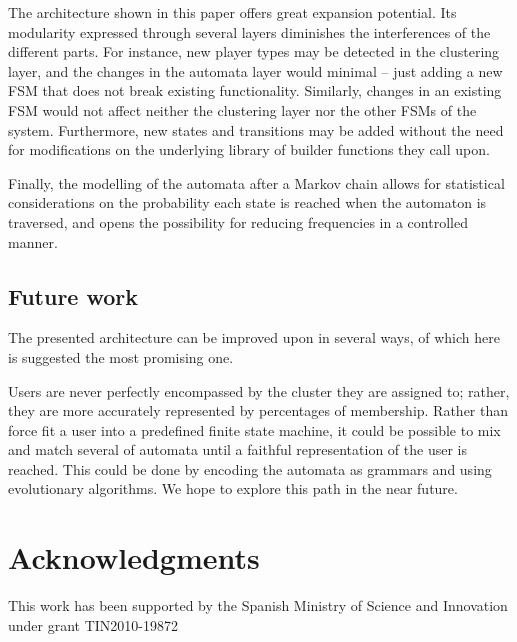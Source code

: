 \documentclass[conference]{IEEEtran}
\begin{document}
The architecture shown in this paper offers great expansion potential. Its modularity expressed through several layers diminishes the interferences of the different parts. For instance, new player types may be detected in the clustering layer, and the changes in the automata layer would minimal -- just adding a new FSM that does not break existing functionality. Similarly, changes in an existing FSM would not affect neither the clustering layer nor the other FSMs of the system. Furthermore, new states and transitions may be added without the need for modifications on the underlying library of builder functions they call upon.

Finally, the modelling of the automata after a Markov chain allows for statistical considerations on the probability each state is reached when the automaton is traversed, and opens the possibility for reducing frequencies in a controlled manner.

\subsection*{Future work}

The presented architecture can be improved upon in several ways, of which here is suggested the most promising one.

Users are never perfectly encompassed by the cluster they are assigned to; rather, they are more accurately represented by percentages of membership. Rather than force fit a user into a predefined finite state machine, it could be possible to mix and match several of automata until a faithful representation of the user is reached. This could be done by encoding the automata as grammars and using evolutionary algorithms. We hope to explore this path in the near future.

\section*{Acknowledgments}
This work has been supported by the
Spanish Ministry of Science and Innovation under grant
TIN2010-19872



%

%
\end{document}
